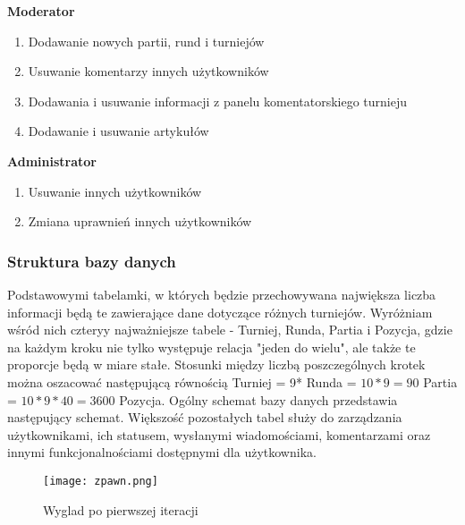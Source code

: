 \documentclass[12pt,leqno]{article}
\begin{document}
{\bf Moderator }
\begin{enumerate}
\item Dodawanie nowych partii, rund i turniejów
\item Usuwanie komentarzy innych użytkowników
\item Dodawania i usuwanie informacji z panelu komentatorskiego turnieju
\item Dodawanie i usuwanie artykułów
\end{enumerate}

{\bf Administrator }
\begin{enumerate}
\item Usuwanie innych użytkowników
\item Zmiana uprawnień innych użytkowników

\end{enumerate}

\subsubsection{Struktura bazy danych}
Podstawowymi tabelamki, w których będzie przechowywana największa liczba informacji będą te zawierające dane dotyczące różnych turniejów. Wyróżniam wśród nich czteryy najważniejsze tabele - Turniej, Runda, Partia i Pozycja, gdzie na każdym kroku nie tylko występuje relacja "jeden do wielu", ale także te proporcje będą w miare stałe. Stosunki między liczbą poszczególnych krotek można oszacować następującą równością Turniej = 9* Runda = $10*9=90$ Partia = $10*9*40=3600$ Pozycja. Ogólny schemat bazy danych przedstawia następujący schemat. Większość pozostałych tabel służy do zarządzania użytkownikami, ich statusem, wysłanymi wiadomościami, komentarzami oraz innymi funkcjonalnościami dostępnymi dla użytkownika.


\begin{figure}
\texttt{[image: zpawn.png]}
\caption{Wyglad po pierwszej iteracji}
\end{figure}
\end{document}

